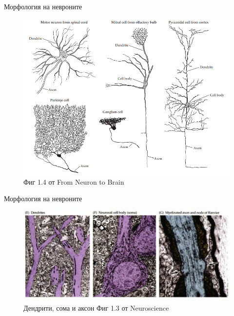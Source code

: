 \begin{frame}[t]{Морфология на невроните}
  \begin{figure}[htbp!]
    \centering
    \includegraphics[width=\textwidth,height=0.7\textheight,keepaspectratio]{neuron-types-2.PNG}
    \caption{Фиг 1.4 от From Neuron to Brain}
  \end{figure}
\end{frame}

\begin{frame}[t]{Морфология на невроните}
  \begin{figure}[htbp!]
    \centering
    \includegraphics[width=\textwidth,height=\textheight,keepaspectratio]{neuron-parts.PNG}
    \caption{Дендрити, сома и аксон Фиг 1.3 от Neuroscience}
    \label{figure:usf}
  \end{figure}
\end{frame}


